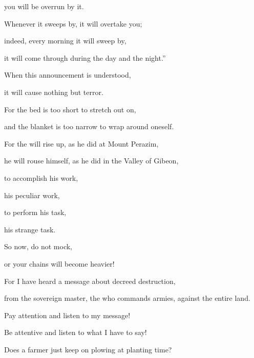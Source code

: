 {\par }{\Q you will be
overrun by it.
\par }{\Q {}Whenever
it sweeps
by, it will overtake
you;
\par }{\Q indeed,
every morning
it will sweep by,
\par }{\Q it will come through
during the day
and the night.”
\par }{\Q When
this announcement
is understood,
\par }{\Q it will cause nothing but terror.
\par }{\Q {}For
the bed
is too short
to stretch out
on,
\par }{\Q and the blanket
is too narrow
to wrap around oneself.
\par }{\Q {}For
the {}
will rise up,
as he did at Mount
Perazim,
\par }{\Q he will rouse
himself, as
he did
in the Valley
of
Gibeon,
\par }{\Q to accomplish
his work,
\par }{\Q his peculiar
work,
\par }{\Q to perform
his task,
\par }{\Q his
strange task.
\par }{\Q {}So now,
do not
mock,
\par }{\Q or
your chains will become heavier!
\par }{\Q For
I
have heard
a message about decreed
destruction,
\par }{\Q from the sovereign
master, the
{}
who commands armies,
against
the entire
land.
\par }{\Q {}Pay attention
and listen
to my message!

\par }{\Q Be attentive
and listen
to what I have to say!
\par }{\Q {}Does a farmer
just keep
on plowing
at planting
time?

}

